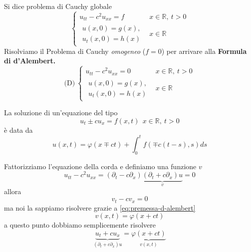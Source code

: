 \documentclass[10pt,a4paper,twoside,openright]{book}
\begin{document}
Si dice problema di Cauchy globale
\begin{equation*}
	\begin{cases}
		u_{tt} -c^{2} u_{xx} =f & x\in \mathbb{R} ,\ t >0 \\
		\begin{array}{l}
		u( x,0) =g( x) ,\\
		u_{t}( x,0) =h( x)
		\end{array}             & x\in \mathbb{R}         
	\end{cases}
\end{equation*}
Risolviamo il Problema di Cauchy \textit{omogeneo} ($f=0$) per arrivare alla \textbf{Formula di d'Alembert.}
\begin{equation*}
	\text{(D)} \ \begin{cases}
	u_{tt} -c^{2} u_{xx} =0 & x\in \mathbb{R} ,\ t >0\\
	\begin{array}{l}
		u( x,0) =g( x) ,   \\
		u_{t}( x,0) =h( x) 
	\end{array} & x\in \mathbb{R}
	\end{cases}
\end{equation*}
\begin{nb}
	[Premessa] La soluzione di un'equazione del tipo
	\begin{equation*}
		u_{t} \pm cu_{x} =f( x,t) \ \ x\in \mathbb{R} ,\ t >0
	\end{equation*}
	è data da
	\begin{equation}
		u( x,t) =\varphi ( x\mp ct) +\int ^{t}_{0} f( \mp c( t-s) ,s) ds
		\label{eq:premessa-d-alembert}
	\end{equation}
\end{nb}
Fattorizziamo l'equazione della corda e definiamo una funzione $v$
\begin{equation*}
	u_{tt} -c^{2} u_{xx} =( \partial _{t} -c\partial _{x})\underbrace{( \partial _{t} +c\partial _{x}) u}_{v} =0
\end{equation*}
allora
\begin{equation*}
	v_{t} -cv_{x} =0
\end{equation*}
ma noi la sappiamo risolvere grazie a \eqref{eq:premessa-d-alembert}
\begin{equation*}
	v( x,t) =\varphi ( x+ct)
\end{equation*}
a questo punto dobbiamo semplicemente risolvere
\begin{equation*}
	\underbrace{u_{t} +cu_{x}}_{( \partial _{t} +c\partial _{x}) u} =\underbrace{\varphi ( x+ct)}_{v( x,t)}
\end{equation*}
\end{document}
